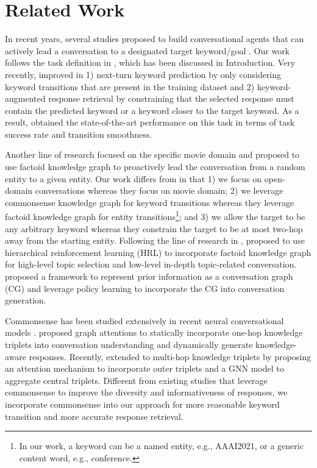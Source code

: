 \documentclass[letterpaper]{article} %
\begin{document}
\section{Related Work}
In recent years, several studies proposed to build conversational agents that can actively lead a conversation to a designated target keyword/goal \cite{tang2019target, wu2019proactive}. Our work follows the task definition in \cite{tang2019target}, which has been discussed in Introduction. Very recently, \citet{qin2020dynamic} improved \cite{tang2019target} in 1) next-turn keyword prediction by only considering keyword transitions that are present in the training dataset and 2) keyword-augmented response retrieval by constraining that the selected response must contain the predicted keyword or a keyword closer to the target keyword. As a result, \citet{qin2020dynamic} obtained the state-of-the-art performance on this task in terms of task success rate and transition smoothness.

Another line of research \cite{wu2019proactive} focused on the specific movie domain and proposed to use factoid knowledge graph to proactively lead the conversation from a random entity to a given entity. Our work differs from \cite{wu2019proactive} in that 1) we focus on open-domain conversations whereas they focus on movie domain; 2) we leverage commonsense knowledge graph for keyword transitions whereas they leverage factoid knowledge graph for entity transitions\footnote{In our work, a keyword can be a named entity, e.g., AAAI2021, or a generic content word, e.g., conference.}; and 3) we allow the target to be any arbitrary keyword whereas they constrain the target to be at most two-hop away from the starting entity. Following the line of research in \cite{wu2019proactive}, \citet{xu2020knowledge} proposed to use hierarchical reinforcement learning (HRL) to incorporate factoid knowledge graph for high-level topic selection and low-level in-depth topic-related conversation. \citet{xu2020conversational} proposed a framework to represent prior information as a conversation graph (CG) and leverage policy learning to incorporate the CG into conversation generation.

Commonsense has been studied extensively in recent neural conversational models \cite{young2018augmenting, zhou2018commonsense, zhang2020grounded, zhong2020care}.
\citet{zhou2018commonsense} proposed graph attentions to statically incorporate one-hop knowledge triplets into conversation understanding and dynamically generate knowledge-aware responses. Recently, \citet{zhang2020grounded} extended \cite{zhou2018commonsense} to multi-hop knowledge triplets by proposing an attention mechanism to incorporate outer triplets and a GNN model to aggregate central triplets. Different from existing studies that leverage commonsense to improve the diversity and informativeness of responses, we incorporate commonsense into our approach for more reasonable keyword transition and more accurate response retrieval.
\end{document}
